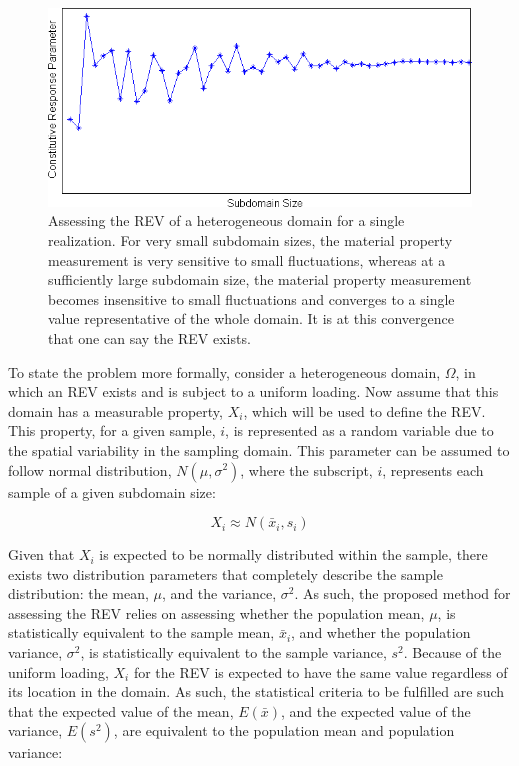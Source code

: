 \begin{figure}[!htb]
\begin{center}
\includegraphics[width=\textwidth]{figures/Chapter3/REVConvergence}
\caption{{\label{fig:revConvergence}Assessing the REV of a heterogeneous domain for a single realization. For very small subdomain sizes, the material property measurement is very sensitive to small fluctuations, whereas at a sufficiently large subdomain size, the material property measurement becomes insensitive to small fluctuations and converges to a single value representative of the whole domain. It is at this convergence that one can say the REV exists.%
}}
\end{center}
\end{figure}

To state the problem more formally, consider a heterogeneous domain, $\Omega$, in which an REV exists and is subject to a uniform loading. Now assume that this domain has a measurable property, $X_i$, which will be used to define the REV. This property, for a given sample, $i$, is represented as a random variable due to the spatial variability in the sampling domain. This parameter can be assumed to follow normal distribution, $N\left(\mu,\sigma^2 \right)$, where the subscript, $i$, represents each sample of a given subdomain size:

\begin{equation}
X_i \approx N\left(\bar{x}_i,s_i \right)
\label{eqn:rev1}
\end{equation}

Given that $X_i$ is expected to be normally distributed within the sample, there exists two distribution parameters that completely describe the sample distribution: the mean, $\mu$, and the variance, $\sigma^2$. As such, the proposed method for assessing the REV relies on assessing whether the population mean, $\mu$, is statistically equivalent to the sample mean, $\bar{x}_i$, and whether the population variance, $\sigma^2$, is statistically equivalent to the sample variance, $s^2$. Because of the uniform loading, $X_i$ for the REV is expected to have the same value regardless of its location in the domain. As such, the statistical criteria to be fulfilled are such that the expected value of the mean, $E\left(\bar{x}\right)$, and the expected value of the variance, $E\left(s^2\right)$, are equivalent to the population mean and population variance:

